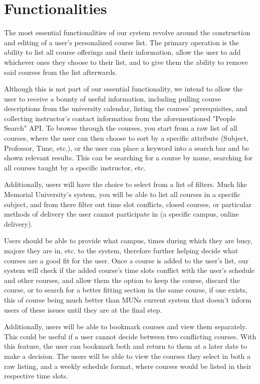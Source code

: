 \documentclass[12pt]{article}
\begin{document}
\section{Functionalities}
The most essential functionalities of our system revolve around the construction and editing of a user's personalized course list. The primary operation is the ability to list all course offerings and their 
information, allow the user to add whichever ones they choose to their list, and to give them the ability to remove said courses from the list afterwards. \par
Although this is not part of our essential functionality, we intend to allow the user to receive a bounty of useful information, including pulling course descriptions from the university calendar, listing the courses' prerequisites, and collecting instructor's contact 
information from the aforementioned "People Search" API. To browse through the courses, you start from a raw list of all courses, where the user can then choose to sort by a specific attribute (Subject, Professor, Time, etc.), or the user can place a keyword into a search bar and be shown relevant results. This can be searching for a course by name, 
searching for all courses taught by a specific instructor, etc. \par 
Additionally, users will have the choice to select from a list of filters. Much like Memorial University's system, you will be able to list all courses in a specific subject, and from there filter out time slot conflicts, closed courses, or particular methods of delivery the user cannot participate in (a specific campus, online delivery).\par
Users should be able to provide what campus, times during which they are busy, majors they are in, etc. to the system, therefore further helping decide what courses are a good fit for the user. Once a course is added to the user's list, our system will check if the added course's time slots conflict with the user's schedule and other courses, and allow them the option to keep the course, discard the course, or to search for a better fitting section in the same course, if one exists, this of course being much better than MUNs current system that doesn't inform users of these issues until they are at the final step. \par
Additionally, users will be able to bookmark courses and view them separately. This could be useful if a user cannot decide between two conflicting courses.  With this feature, the user can bookmark both and return to them at a later date to make a decision. The users will be able to view the courses they select in both a raw listing, and a weekly schedule format, where courses would be listed in their respective time slots. \par
\end{document}
